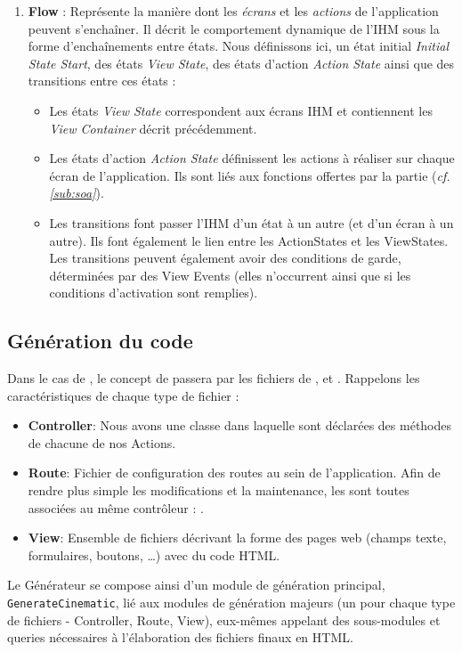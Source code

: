 \begin{enumerate}
\item \textbf{Flow} : Représente la manière dont les \textit{écrans} et les \textit{actions} de l'application peuvent s'enchaîner. Il décrit le comportement dynamique de l'\textsc{IHM} sous la forme d'enchaînements entre états. Nous définissons ici, un état initial \textit{Initial State Start}, des états  \textit{View State}, des états d'action \textit{Action State} ainsi que des transitions entre ces états :
\begin{itemize}
\item Les états \textit{View State} correspondent aux écrans \textsc{IHM} et contiennent les \textit{View Container} décrit précédemment.
\item Les états d'action \textit{Action State} définissent les actions à réaliser sur chaque écran de l'application. Ils sont liés aux fonctions offertes par la partie \kwsoa{} (\textit{cf. \ref{sub:soa}}).
\item Les transitions  font passer l'\textsc{IHM} d'un état à un autre (et d'un écran à un autre). Ils font également le lien entre les ActionStates et les ViewStates. Les transitions peuvent également avoir des conditions de garde, déterminées par des View Events (elles n'occurrent ainsi que si les conditions d'activation sont remplies).

\end{itemize}
\end{enumerate}       


\subsection{Génération du code}
Dans le cas de \kwplay, le concept de \kwcinematic passera par les fichiers de ,  et . Rappelons les caractéristiques de chaque type de fichier :
\begin{itemize}
\item \textbf{Controller}: Nous avons une classe  dans laquelle sont déclarées des méthodes de chacune de nos Actions.
\item \textbf{Route}: Fichier de configuration des routes au sein de l'application. Afin de rendre plus simple les modifications et la maintenance, les  sont toutes associées au même contrôleur : . 
\item \textbf{View}: Ensemble de fichiers décrivant la forme des pages web (champs texte, formulaires, boutons, \dots) avec du code HTML.
\\
\end{itemize}
Le Générateur \guim{\kwcinematic{}} se compose ainsi d'un module de génération principal, \verb+GenerateCinematic+, lié aux modules de génération majeurs (un pour chaque type de fichiers - Controller, Route, View), eux-mêmes appelant des sous-modules et queries nécessaires à l'élaboration des fichiers finaux en HTML.

